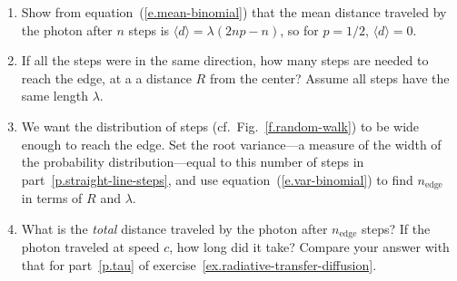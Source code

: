\begin{exercisebox}
\begin{enumerate}
\item
Show from equation~(\ref{e.mean-binomial}) that the mean distance traveled by the photon after $n$ steps is $\langle d\rangle = \lambda(2np-n)$, so for $p=1/2$, $\langle d\rangle = 0$.

\item
If all the steps were in the same direction, how many steps are needed to reach the edge, at a a distance $R$ from the center? Assume all steps have the same length $\lambda$.

\item\label{p.straight-line-steps}
We want the distribution of steps (cf.\ Fig.~\ref{f.random-walk}) to be wide enough to reach the edge. Set the root variance---a measure of the width of the probability distribution---equal to this number of steps in part~\ref{p.straight-line-steps}, and use equation~(\ref{e.var-binomial}) to find $n_{\mathrm{edge}}$ in terms of $R$ and $\lambda$.

\item
What is the \emph{total} distance traveled by the photon after $n_{\mathrm{edge}}$ steps? If the photon traveled at speed $c$, how long did it take? Compare your answer with that for part~\ref{p.tau} of exercise~\ref{ex.radiative-transfer-diffusion}.

\end{enumerate}
\end{exercisebox}
